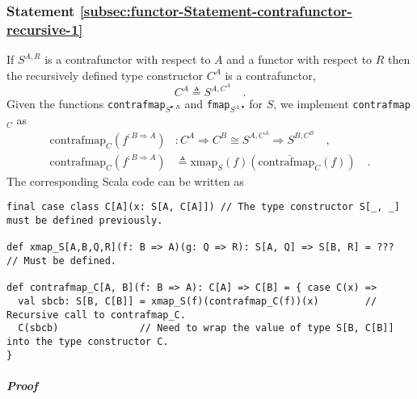 \subsubsection{Statement \label{subsec:functor-Statement-contrafunctor-recursive-1}\ref{subsec:functor-Statement-contrafunctor-recursive-1}}

If $S^{A,R}$ is a contrafunctor with respect to $A$ and a functor
with respect to $R$ then the recursively defined type constructor
$C^{A}$ is a contrafunctor,
\[
C^{A}\triangleq S^{A,C^{A}}\quad.
\]
Given the functions \lstinline!contrafmap!$_{S^{\bullet,R}}$ and
\lstinline!fmap!$_{S^{A,\bullet}}$ for $S$, we implement \lstinline!contrafmap!$_{C}$
as
\begin{align*}
\text{contrafmap}_{C}(f^{:B\Rightarrow A}) & :C^{A}\Rightarrow C^{B}\cong S^{A,C^{A}}\Rightarrow S^{B,C^{B}}\quad,\\
\text{contrafmap}_{C}(f^{:B\Rightarrow A}) & \triangleq\text{xmap}_{S}(f)(\overline{\text{contrafmap}_{C}}(f))\quad.
\end{align*}
The corresponding Scala code can be written as
\begin{lstlisting}
final case class C[A](x: S[A, C[A]]) // The type constructor S[_, _] must be defined previously.

def xmap_S[A,B,Q,R](f: B => A)(g: Q => R): S[A, Q] => S[B, R] = ???          // Must be defined.

def contrafmap_C[A, B](f: B => A): C[A] => C[B] = { case C(x) =>
  val sbcb: S[B, C[B]] = xmap_S(f)(contrafmap_C(f))(x)        // Recursive call to contrafmap_C.
  C(sbcb)              // Need to wrap the value of type S[B, C[B]] into the type constructor C.
}
\end{lstlisting}


\subparagraph{Proof}


